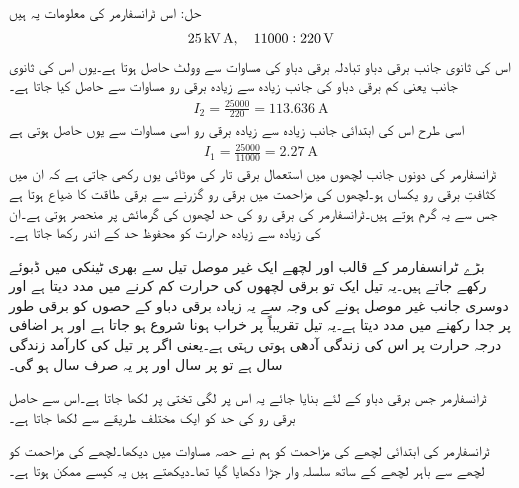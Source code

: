حل:	اس ٹرانسفارمر کی معلومات یہ ہیں
\begin{align*}
\SI{25}{\kilo \volt \ampere}, \quad 11000:220\,\textup{V}
\end{align*}
اس کی ثانوی جانب برقی دباو تبادلہ برقی دباو کی مساوات سے   وولٹ حاصل ہوتا ہے۔یوں اس کی ثانوی جانب یعنی کم برقی دباو کی جانب زیادہ سے زیادہ برقی رو مساوات   سے حاصل کیا جاتا ہے۔
\begin{align*}
I_2=\frac{25000}{220}=\SI{113.636}{\ampere}
\end{align*}
اسی طرح اس کی ابتدائی جانب زیادہ سے زیادہ برقی رو اسی مساوات سے یوں حاصل ہوتی ہے
\begin{align*}
I_1=\frac{25000}{11000}=\SI{2.27}{\ampere}
\end{align*}
%
ٹرانسفارمر کی دونوں جانب لچھوں میں استعمال برقی تار کی موٹائی یوں رکھی جاتی ہے کہ ان میں کثافتِ برقی رو  یکساں ہو۔لچھوں کی مزاحمت میں برقی رو گزرنے سے برقی طاقت کا ضیاع ہوتا ہے جس سے یہ گرم ہوتے ہیں۔ٹرانسفارمر کی برقی رو کی حد لچھوں کی گرمائش پر منحصر ہوتی ہے۔ان کی زیادہ سے زیادہ حرارت کو محفوظ حد کے اندر رکھا جاتا ہے۔

بڑے ٹرانسفارمر کے قالب اور لچھے ایک غیر موصل تیل سے بھری ٹینکی میں ڈبوئے رکھے جاتے ہیں۔یہ تیل ایک تو برقی لچھوں کی حرارت کم کرنے میں مدد دیتا ہے اور دوسری جانب غیر موصل ہونے کی وجہ سے یہ زیادہ برقی دباو کے حصوں کو برقی طور پر جدا رکھنے میں مدد دیتا ہے۔یہ تیل تقریباً   پر خراب ہونا شروع ہو جاتا ہے اور ہر  اضافی درجہ حرارت پر اس کی زندگی آدھی ہوتی رہتی ہے۔یعنی اگر  پر تیل کی کارآمد زندگی  سال ہے تو  پر  سال اور   پر یہ صرف   سال ہو گی۔

	ٹرانسفارمر جس برقی دباو کے لئے بنایا جائے  یہ اس پر لگی تختی پر لکھا جاتا ہے۔اس سے حاصل برقی رو کی حد کو ایک مختلف طریقے سے لکھا جاتا ہے۔

ٹرانسفارمر کی ابتدائی لچھے کی مزاحمت  کو ہم نے حصہ  مساوات  میں دیکھا۔لچھے کی مزاحمت کو لچھے سے باہر لچھے کے ساتھ سلسلہ وار جڑا دکھایا گیا تھا۔دیکھتے ہیں یہ کیسے ممکن ہوتا ہے۔

